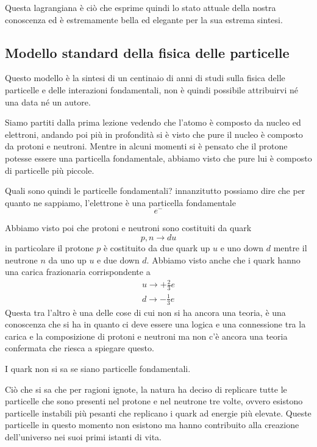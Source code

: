 Questa lagrangiana è ciò che esprime quindi lo stato attuale della nostra conoscenza ed è estremamente bella ed elegante per la sua estrema sintesi.

\subsection{Modello standard della fisica delle particelle}
Questo modello è la sintesi di un centinaio di anni di studi sulla fisica delle particelle e delle interazioni fondamentali, non è quindi possibile attribuirvi né una data né un autore.

Siamo partiti dalla prima lezione vedendo che l'atomo è composto da nucleo ed elettroni, andando poi più in profondità si è visto che pure il nucleo è composto da protoni e neutroni.
Mentre in alcuni momenti si è pensato che il protone potesse essere una particella fondamentale, abbiamo visto che pure lui è composto di particelle più piccole.

Quali sono quindi le particelle fondamentali?
innanzitutto possiamo dire che per quanto ne sappiamo, l'elettrone è una particella fondamentale
\[
e^-
\]

Abbiamo visto poi che protoni e neutroni sono costituiti da quark
\[
p, n \longrightarrow d u
\]
in particolare il protone $p$ è costituito da due quark up $u$ e uno down $d$ mentre il neutrone $n$ da uno up $u$ e due down $d$.
Abbiamo visto anche che i quark hanno una carica frazionaria corrispondente a 
\[
\begin{split}
u\to +\frac{2}{3}e\\
d\to -\frac{1}{3}e
\end{split}
\]
Questa tra l'altro è una delle cose di cui non si ha ancora una teoria, è una conoscenza che si ha in quanto ci deve essere una logica e una connessione tra la carica e la composizione di protoni e neutroni ma non c'è ancora una teoria confermata che riesca a spiegare questo.

I quark non si sa se siano particelle fondamentali.

Ciò che si sa che per ragioni ignote, la natura ha deciso di replicare tutte le particelle che sono presenti nel protone e nel neutrone tre volte, ovvero esistono particelle instabili più  pesanti che replicano i quark ad energie più elevate.
Queste particelle in questo momento non esistono ma hanno contribuito alla creazione dell'universo nei suoi primi istanti di vita.

